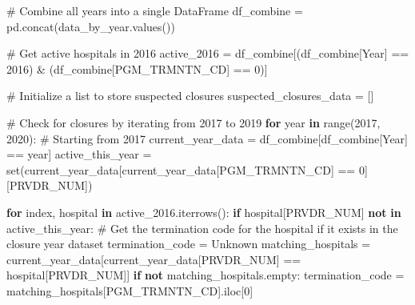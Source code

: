 \documentclass[
  letterpaper,
  DIV=11,
  numbers=noendperiod]{scrartcl}
\newenvironment{Shaded}{\begin{snugshade}}{\end{snugshade}}
\newcommand{\BuiltInTok}[1]{\textcolor[rgb]{0.00,0.23,0.31}{#1}}
\newcommand{\CommentTok}[1]{\textcolor[rgb]{0.37,0.37,0.37}{#1}}
\newcommand{\ControlFlowTok}[1]{\textcolor[rgb]{0.00,0.23,0.31}{\textbf{#1}}}
\newcommand{\DecValTok}[1]{\textcolor[rgb]{0.68,0.00,0.00}{#1}}
\newcommand{\KeywordTok}[1]{\textcolor[rgb]{0.00,0.23,0.31}{\textbf{#1}}}
\newcommand{\NormalTok}[1]{\textcolor[rgb]{0.00,0.23,0.31}{#1}}
\newcommand{\OperatorTok}[1]{\textcolor[rgb]{0.37,0.37,0.37}{#1}}
\newcommand{\StringTok}[1]{\textcolor[rgb]{0.13,0.47,0.30}{#1}}
\begin{document}
\begin{Shaded}
\begin{Highlighting}[]
\CommentTok{\# Combine all years into a single DataFrame}
\NormalTok{df\_combine }\OperatorTok{=}\NormalTok{ pd.concat(data\_by\_year.values())}

\CommentTok{\# Get active hospitals in 2016}
\NormalTok{active\_2016 }\OperatorTok{=}\NormalTok{ df\_combine[(df\_combine[}\StringTok{\textquotesingle{}Year\textquotesingle{}}\NormalTok{] }\OperatorTok{==} \DecValTok{2016}\NormalTok{) }\OperatorTok{\&}\NormalTok{ (df\_combine[}\StringTok{\textquotesingle{}PGM\_TRMNTN\_CD\textquotesingle{}}\NormalTok{] }\OperatorTok{==} \DecValTok{0}\NormalTok{)]}

\CommentTok{\# Initialize a list to store suspected closures}
\NormalTok{suspected\_closures\_data }\OperatorTok{=}\NormalTok{ []}

\CommentTok{\# Check for closures by iterating from 2017 to 2019}
\ControlFlowTok{for}\NormalTok{ year }\KeywordTok{in} \BuiltInTok{range}\NormalTok{(}\DecValTok{2017}\NormalTok{, }\DecValTok{2020}\NormalTok{):  }\CommentTok{\# Starting from 2017}
\NormalTok{    current\_year\_data }\OperatorTok{=}\NormalTok{ df\_combine[df\_combine[}\StringTok{\textquotesingle{}Year\textquotesingle{}}\NormalTok{] }\OperatorTok{==}\NormalTok{ year]}
\NormalTok{    active\_this\_year }\OperatorTok{=} \BuiltInTok{set}\NormalTok{(current\_year\_data[current\_year\_data[}\StringTok{\textquotesingle{}PGM\_TRMNTN\_CD\textquotesingle{}}\NormalTok{] }\OperatorTok{==} \DecValTok{0}\NormalTok{][}\StringTok{\textquotesingle{}PRVDR\_NUM\textquotesingle{}}\NormalTok{])}

    \ControlFlowTok{for}\NormalTok{ index, hospital }\KeywordTok{in}\NormalTok{ active\_2016.iterrows():}
        \ControlFlowTok{if}\NormalTok{ hospital[}\StringTok{\textquotesingle{}PRVDR\_NUM\textquotesingle{}}\NormalTok{] }\KeywordTok{not} \KeywordTok{in}\NormalTok{ active\_this\_year:}
            \CommentTok{\# Get the termination code for the hospital if it exists in the closure year dataset}
\NormalTok{            termination\_code }\OperatorTok{=} \StringTok{\textquotesingle{}Unknown\textquotesingle{}}
\NormalTok{            matching\_hospitals }\OperatorTok{=}\NormalTok{ current\_year\_data[current\_year\_data[}\StringTok{\textquotesingle{}PRVDR\_NUM\textquotesingle{}}\NormalTok{] }\OperatorTok{==}\NormalTok{ hospital[}\StringTok{\textquotesingle{}PRVDR\_NUM\textquotesingle{}}\NormalTok{]]}
            \ControlFlowTok{if} \KeywordTok{not}\NormalTok{ matching\_hospitals.empty:}
\NormalTok{                termination\_code }\OperatorTok{=}\NormalTok{ matching\_hospitals[}\StringTok{\textquotesingle{}PGM\_TRMNTN\_CD\textquotesingle{}}\NormalTok{].iloc[}\DecValTok{0}\NormalTok{]}


\end{Highlighting}
\end{Shaded}
\end{document}
